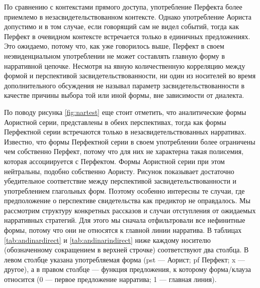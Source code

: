 По сравнению с контекстами прямого доступа, употребление Перфекта более приемлемо в незасвидетельствованном контексте. Однако употребление Аориста допустимо и в том случае, если говорящий сам не видел событий, тогда как Перфект в очевидном контексте встречается только в единичных предложениях. Это ожидаемо, потому что, как уже говорилось выше, Перфект в своем неэвиденциальном употреблении не может составлять главную форму в нарративной цепочке. Несмотря на явную количественную корреляцию между формой и перспективой засвидетельствованности, ни один из носителей во время дополнительного обсуждения не называл параметр засвидетельствованности в качестве причины выбора той или иной формы, вне зависимости от диалекта. 
\par По поводу рисунка \ref{fig:nartest} еще стоит отметить, что аналитические формы Аористной серии, представлены в обеих перспективах, тогда как формы Перфектной серии встречаются только в незасвидетельствованных нарративах. Известно, что формы Перфектной серии в своем употреблении более ограничены чем собственно Перфект, потому что для них не характерна такая полисемия, которая ассоциируется с Перфектом. Формы Аористной серии при этом нейтральны, подобно собственно Аористу. Рисунок показывает достаточно убедительное соответствие между перспективой засвидетельствованности и употреблением глагольных форм. Поэтому особенно интересны те случаи, где предположение о перспективе свидетельства как предиктор не оправдалось. Мы рассмотрим структуру конкретных рассказов и случаи отступления от ожидаемых нарративных стратегий. Для этого мы сначала отфильтровали все нефинитные формы, потому что они не относятся к главной линии нарратива. В таблицах \ref{tab:andinardirect} и \ref{tab:andinarindirect} ниже каждому носителю (обозначенному сокращением в верхней строчке) соответствуют два столбца. В левом столбце указана употребляемая форма (pst --- Аорист; pf Перфект; x --- другое), а в правом столбце --- функция предложения, к которому форма/клауза относится (0 --- первое предложение нарратива;  1 --- главная линия).

